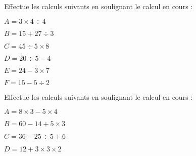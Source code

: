 \begin{exercice}
Effectue les calculs suivants en soulignant le calcul en cours :
 \begin{colitemize}{2}
\item $A = 3 \times 4 \div 4$

\dotfill

\dotfill

\item $B = 15 + 27 \div 3$

\dotfill
	
\dotfill

\item $C = 45 \div 5 \times 8$

\dotfill
	
\dotfill

\item $D = 20 \div 5 - 4$

\dotfill
	
\dotfill

\item $E = 24 - 3 \times 7$

\dotfill
	
\dotfill

\item $F = 15 - 5 \div 2$

\dotfill

\dotfill

\end{colitemize}
\end{exercice}


\begin{exercice}
Effectue les calculs suivants en soulignant le calcul en cours :
 \begin{colitemize}{2}
\item $A = 8 \times 3 - 5 \times 4$

\dotfill

\dotfill

\item $B = 60 - 14 + 5 \times 3$

\dotfill

\dotfill

\item $C = 36 - 25 \div 5 + 6$

\dotfill

\dotfill

\item $D = 12 + 3 \times 3 \times 2$

\dotfill

\dotfill
 \end{colitemize}
\end{exercice}


